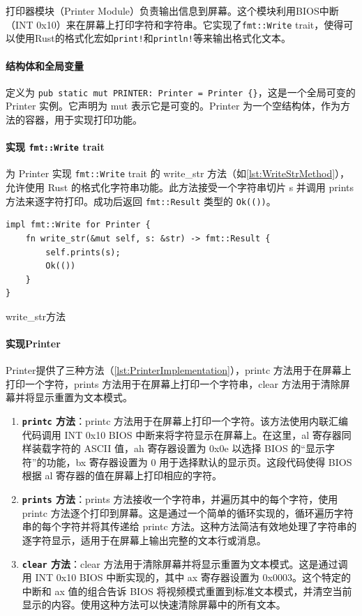打印器模块（Printer Module）负责输出信息到屏幕。这个模块利用BIOS中断（INT 0x10）来在屏幕上打印字符和字符串。它实现了\texttt{fmt::Write} trait，使得可以使用Rust的格式化宏如\texttt{print!}和\texttt{println!}等来输出格式化文本。

\paragraph{结构体和全局变量}

定义为 \texttt{pub static mut PRINTER: Printer = Printer \{\}}，这是一个全局可变的 Printer 实例。它声明为 mut 表示它是可变的。Printer 为一个空结构体，作为方法的容器，用于实现打印功能。

\paragraph{实现 \texttt{fmt::Write} trait}

为 Printer 实现 \texttt{fmt::Write} trait 的 write\_str 方法（如\cref{lst:WriteStrMethod}），允许使用 Rust 的格式化字符串功能。此方法接受一个字符串切片 s 并调用 prints 方法来逐字符打印。成功后返回 \texttt{fmt::Result} 类型的 \texttt{Ok(())}。

\begin{listing}[htbp]
    \begin{verbatim}
impl fmt::Write for Printer {
    fn write_str(&mut self, s: &str) -> fmt::Result {
        self.prints(s);
        Ok(())
    }
}
    \end{verbatim}
    \caption{write\_str方法}\label{lst:WriteStrMethod}
\end{listing}

\paragraph{实现Printer}

Printer提供了三种方法（\cref{lst:PrinterImplementation}），printc 方法用于在屏幕上打印一个字符，prints 方法用于在屏幕上打印一个字符串，clear 方法用于清除屏幕并将显示重置为文本模式。

\begin{enumerate}
    \item \textbf{\texttt{printc} 方法}：printc 方法用于在屏幕上打印一个字符。该方法使用内联汇编代码调用 INT 0x10 BIOS 中断来将字符显示在屏幕上。在这里，al 寄存器同样装载字符的 ASCII 值，ah 寄存器设置为 0x0e 以选择 BIOS 的“显示字符”的功能，bx 寄存器设置为 0 用于选择默认的显示页。这段代码使得 BIOS 根据 al 寄存器的值在屏幕上打印相应的字符。
    \item \textbf{\texttt{prints} 方法}：prints 方法接收一个字符串，并遍历其中的每个字符，使用 printc 方法逐个打印到屏幕。这是通过一个简单的循环实现的，循环遍历字符串的每个字符并将其传递给 printc 方法。这种方法简洁有效地处理了字符串的逐字符显示，适用于在屏幕上输出完整的文本行或消息。
    \item \textbf{\texttt{clear} 方法}：clear 方法用于清除屏幕并将显示重置为文本模式。这是通过调用 INT 0x10 BIOS 中断实现的，其中 ax 寄存器设置为 0x0003。这个特定的中断和 ax 值的组合告诉 BIOS 将视频模式重置到标准文本模式，并清空当前显示的内容。使用这种方法可以快速清除屏幕中的所有文本。
\end{enumerate}

